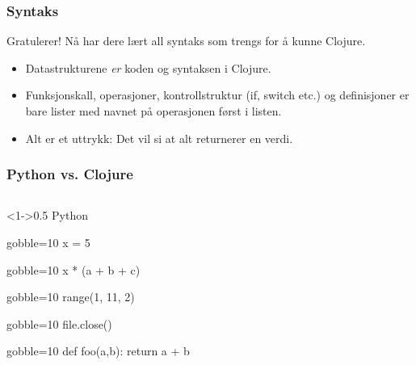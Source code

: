 \documentclass{beamer}
\begin{document}
\begin{frame}
  \frametitle{Syntaks}
  Gratulerer! Nå har dere lært all syntaks som trengs for å kunne Clojure.
  \begin{itemize}
    \item<2-> Datastrukturene {\em er} koden og syntaksen i Clojure.
    \item<3-> Funksjonskall, operasjoner, kontrollstruktur (if, switch etc.) og
      definisjoner er bare lister med navnet på operasjonen først i listen.
    \item<4-> Alt er et uttrykk: Det vil si at alt returnerer en verdi.
  \end{itemize}
\end{frame}

\begin{frame}[fragile, t]
  \frametitle{Python vs. Clojure}
  \begin{columns}[T]
    \begin{column}<1->{0.5\textwidth}
      Python
      \begin{overprint} %
        \begin{pycode*}{gobble=10}
          x = 5
        \end{pycode*}
      \end{overprint}
      \begin{overprint}
        \begin{pycode*}{gobble=10}
          x * (a + b + c)
        \end{pycode*}
      \end{overprint}
      \begin{overprint} %
        \begin{pycode*}{gobble=10}
          range(1, 11, 2)
        \end{pycode*}
      \end{overprint}
      \begin{overprint}
        \begin{pycode*}{gobble=10}
          file.close()
        \end{pycode*}
      \end{overprint}
      \begin{overprint}
        \begin{pycode*}{gobble=10}
          def foo(a,b):
              return a + b
        \end{pycode*}
      \end{overprint}
    \end{column}


\end{columns}
\end{frame}
\end{document}
